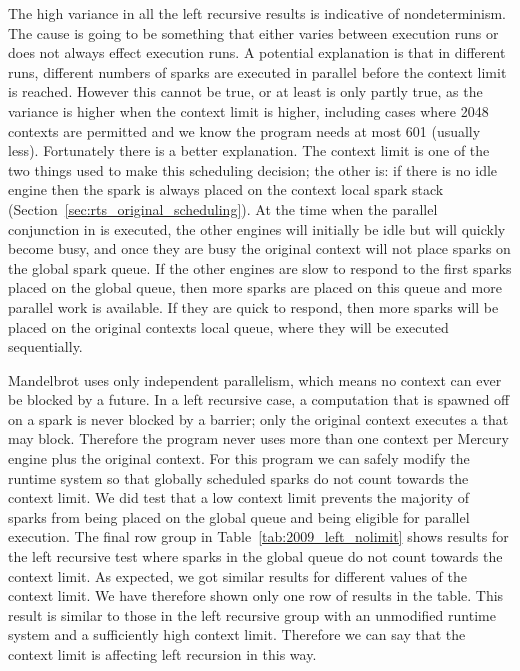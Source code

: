 The high variance in all the left recursive results is
indicative of nondeterminism.
The cause is going to be something that either varies between execution
runs or does not always effect execution runs.
A potential explanation is that in different runs, different numbers of
sparks are executed in parallel before the context limit is reached.
However this cannot be true, or at least is only partly true,
as the variance is higher when the context limit is higher,
including cases
where 2048 contexts are permitted and we know the program needs at most 601
(usually less).
Fortunately there is a better explanation.
The context limit is one of the two things used to make this scheduling
decision;
the other is: if there is no idle engine then the spark is always
placed on the context local spark stack
(Section~\ref{sec:rts_original_scheduling}).
At the time when the parallel conjunction in  is executed,
the other engines will initially be idle but will quickly become busy,
and once they are busy the original context will not place sparks on the
global spark queue.
If the other engines are slow to respond to the first sparks placed
on the global queue,
then more sparks are placed on this queue and more
parallel work is available.
If they are quick to respond,
then more sparks will be placed on the original contexts local queue,
where they will be executed sequentially.

Mandelbrot uses only independent parallelism, which means no context can
ever be blocked by a future.
In a left recursive case,
a computation that is spawned off on a spark is
never blocked by a \joinandcontinue barrier;
only the original context executes a \joinandcontinue that may block.
Therefore the program never uses more than one context per Mercury engine
plus the original context.
For this program we can safely modify the runtime system so that globally
scheduled sparks do not count towards the context limit.
We did test 
that a low context limit prevents the majority of sparks from being placed on
the global queue and being eligible for parallel execution.
The final row group in
Table~\ref{tab:2009_left_nolimit}
shows results for the left recursive test
where sparks in the global queue do not count towards the context limit.
As expected, we got similar results for different values of the context
limit.
We have therefore shown only one row of results in the table.
This result is similar to those in the left recursive group with an
unmodified runtime system and a sufficiently high context limit.
Therefore we can say that the context limit is affecting left recursion in
this way.

